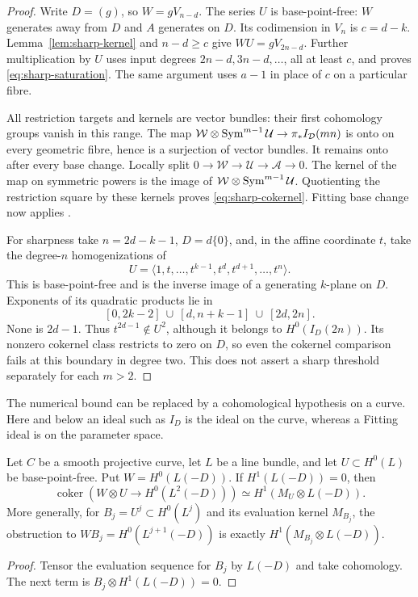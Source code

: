 \begin{proof}
Write $D=(g)$, so $W=gV_{n-d}$. The series $U$ is base-point-free:
$W$ generates away from $D$ and $A$ generates on $D$.
Its codimension in $V_n$ is $c=d-k$. Lemma~\ref{lem:sharp-kernel}
and $n-d\ge c$ give
$WU=gV_{2n-d}$. Further multiplication by $U$ uses input degrees
$2n-d,3n-d,\ldots$, all at least $c$, and proves
\eqref{eq:sharp-saturation}. The same argument uses $a-1$ in place of
$c$ on a particular fibre.

All restriction targets and kernels are vector bundles: their first
cohomology groups vanish in this range. The map
$\mathcal W\otimes\operatorname{Sym}^{m-1}\mathcal U\to\pi_*I_{\mathcal D}(mn)$
is onto on every geometric fibre, hence is a surjection of vector
bundles. It remains onto after every base change. Locally split
$0\to\mathcal W\to\mathcal U\to\mathcal A\to0$. The kernel of the
map on symmetric powers is the image of
$\mathcal W\otimes\operatorname{Sym}^{m-1}\mathcal U$. Quotienting the restriction
square by these kernels proves \eqref{eq:sharp-cokernel}. Fitting
base change now applies \cite{StacksFitting}.

For sharpness take $n=2d-k-1$, $D=d\{0\}$, and, in the affine
coordinate $t$, take the degree-$n$ homogenizations of
\[
 U=\langle1,t,\ldots,t^{k-1},t^d,t^{d+1},\ldots,t^n\rangle.
\]
This is base-point-free and is the inverse image of a generating
$k$-plane on $D$. Exponents of its quadratic products lie in
\[
 [0,2k-2]\ \cup\ [d,n+k-1]\ \cup\ [2d,2n].
\]
None is $2d-1$. Thus $t^{2d-1}\notin U^2$, although it belongs to
$H^0(I_D(2n))$. Its nonzero cokernel class restricts to zero on $D$,
so even the cokernel comparison fails at this boundary in degree two.
This does not assert a sharp threshold separately for each $m>2$.
\end{proof}

The numerical bound can be replaced by a cohomological hypothesis on
a curve. Here and below an ideal such as $I_D$ is the ideal on the
curve, whereas a Fitting ideal is on the parameter space.

\begin{proposition}\label{prop:curve-kernel-test}
Let $C$ be a smooth projective curve, let $L$ be a line bundle, and
let $U\subset H^0(L)$ be base-point-free. Put $W=H^0(L(-D))$.
If $H^1(L(-D))=0$, then
\[
 \operatorname{coker}(W\otimes U\to H^0(L^2(-D)))
       \simeq H^1(M_U\otimes L(-D)).
\]
More generally, for $B_j=U^j\subset H^0(L^j)$ and its evaluation
kernel $M_{B_j}$, the obstruction to
$WB_j=H^0(L^{j+1}(-D))$ is exactly
$H^1(M_{B_j}\otimes L(-D))$.
\end{proposition}
\begin{proof}
Tensor the evaluation sequence for $B_j$ by $L(-D)$ and take
cohomology. The next term is $B_j\otimes H^1(L(-D))=0$.
\end{proof}


